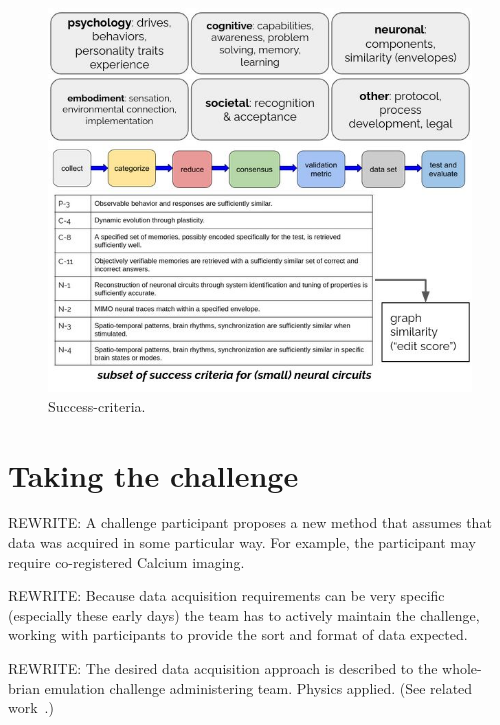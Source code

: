 \documentclass{ldr-article}
\begin{document}
\begin{figure}
	\centering
	\includegraphics[width=1\linewidth]{figures/success-criteria.jpg}
	\caption{Success-criteria.}
	\label{fig:success-criteria}
\end{figure}



\section{Taking the challenge}

\alert{REWRITE:} A challenge participant proposes a new method that assumes that data was acquired in some particular way. For example, the participant may require co-registered Calcium imaging.

\alert{REWRITE:} Because data acquisition requirements can be very specific (especially these early days) the team has to actively maintain the challenge, working with participants to provide the sort and format of data expected.

\alert{REWRITE:} The desired data acquisition approach is described to the whole-brian emulation challenge administering team. Physics applied. (See related work~\cite{aberra2018}.)
\end{document}
